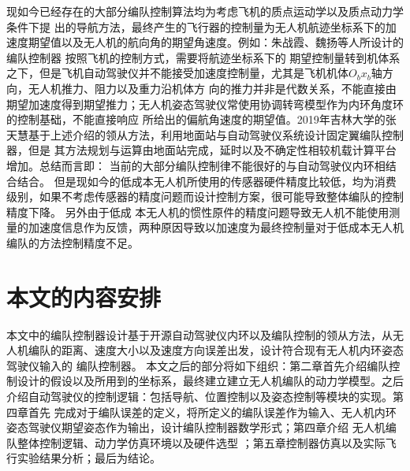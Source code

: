 现如今已经存在的大部分编队控制算法均为考虑飞机的质点运动学以及质点动力学条件下提
出的导航方法，最终产生的飞行器的控制量为无人机航迹坐标系下的加速度期望值以及无人机的航向角的期望角速度。例如：朱战霞、魏扬等人所设计的编队控制器
按照飞机的控制方式，需要将航迹坐标系下的
期望控制量转到机体系之下，但是飞机自动驾驶仪并不能接受加速度控制量，尤其是飞机机体$O_bx_b$轴方向，无人机推力、阻力以及重力沿机体方
向的推力并非是代数关系，不能直接由期望加速度得到期望推力；无人机姿态驾驶仪常使用协调转弯模型作为内环角度环的控制基础，不能直接响应
所给出的偏航角速度的期望值。2019年吉林大学的张天慧基于上述介绍的领从方法，利用地面站与自动驾驶仪系统设计固定翼编队控制器，\cite{Zhangtianhui2019}但是
其方法规划与运算由地面站完成，延时以及不确定性相较机载计算平台增加。总结而言即：
当前的大部分编队控制律不能很好的与自动驾驶仪内环相结合结合。
但是现如今的低成本无人机所使用的传感器硬件精度比较低，均为消费级别，如果不考虑传感器的精度问题而设计控制方案，很可能导致整体编队的控制精度下降。
另外由于低成
本无人机的惯性原件的精度问题导致无人机不能使用测量的加速度信息作为反馈，两种原因导致以加速度为最终控制量对于低成本无人机编队的方法控制精度不足。
\section{本文的内容安排}
本文中的编队控制器设计基于开源自动驾驶仪内环以及编队控制的领从方法，从无人机编队的距离、速度大小以及速度方向误差出发，设计符合现有无人机内环姿态驾驶仪输入的
编队控制器。
本文之后的部分将如下组织：第二章首先介绍编队控制设计的假设以及所用到的坐标系，最终建立建立无人机编队的动力学模型。之后介绍自动驾驶仪的控制逻辑：包括导航、位置控制以及姿态控制等模块的实现。第四章首先
完成对于编队误差的定义，将所定义的编队误差作为输入、无人机内环姿态驾驶仪期望姿态作为输出，设计编队控制器数学形式；第四章介绍
无人机编队整体控制逻辑、动力学仿真环境以及硬件选型 ；第五章控制器仿真以及实际飞行实验结果分析；最后为结论。
